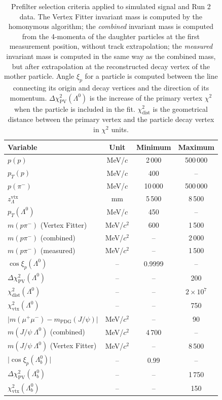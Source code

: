 \begin{table}[t]
	\begin{center}
	\begin{tabular}{|l|c||c|c|}
		\hline
		Variable & Unit & Minimum & Maximum \\
		\hline
		\hline
		$p(p)$ 						& MeV/$c$ 	& 2\,000	& 500\,000 \\
		$p_T(p)$ 					& MeV/$c$ 	& 400		& -- \\
		$p(\pi^-)$ 					& MeV/$c$ 	& 10\,000	& 500\,000 \\
		$z_\Lambda^\text{vtx}$		& mm		& 5\,500	& 8\,500 \\
		$p_T(\Lambda^0)$ 			& MeV/$c$ 	& 450		& -- \\
		$m(p\pi^-)$	(Vertex Fitter)	& MeV/$c^2$	& 600		& 1\,500 \\
		$m(p\pi^-)$	(combined)		& MeV/$c^2$	& --		& 2\,000 \\
		$m(p\pi^-)$	(measured)		& MeV/$c^2$	& --		& 1\,500 \\
		$\cos\xi_p (\Lambda^0)$		& --		& 0.9999	& -- \\
		$\Delta \chi^2_\text{PV} (\Lambda^0)$
									& -- 		& --		& 200 \\
		$\chi^2_\text{dist} (\Lambda^0)$
									& --		& --		& $2\times{10}^{7}$ \\
		$\chi^2_\text{vtx} (\Lambda^0)$
									& --		& --		& 750 \\
		$\lvert m(\mu^+ \mu^-) - m_\text{PDG} (J/\psi) \rvert$
									& MeV/$c^2$ & --		& 90 \\
		$m(J/\psi~\Lambda^0)$ (combined)
									& MeV/$c^2$	& 4\,700		& -- \\
		$m(J/\psi~\Lambda^0)$ (Vertex Fitter)
									& MeV/$c^2$	& --		& 8\,500 \\
		$\lvert \cos\xi_p (\Lambda^0_b) \rvert$
									& --		& 0.99		& -- \\
		$\Delta \chi^2_\text{PV} (\Lambda^0_b)$
									& -- 		& --		& 1\,750 \\
		$\chi^2_\text{vtx} (\Lambda^0_b)$
									& --		& --		& 150 \\
		\hline
	\end{tabular}
	\end{center}
	\caption{Prefilter selection criteria applied to simulated \demonstratorshort signal and Run 2 data. The Vertex Fitter invariant mass is computed by the homonymous algorithm; the \textit{combined} invariant mass is computed from the 4-momenta of the daughter particles at the first measurement position, without track extrapolation; the \textit{measured} invariant mass is computed in the same way as the combined mass, but after extrapolation at the reconstructed decay vertex of the mother particle. Angle $\xi_p$ for a particle is computed between the line connecting its origin and decay vertices and the direction of its momentum. $\Delta \chi^2_\text{PV} (\Lambda^0)$ is the increase of the primary vertex $\chi^2$ when the particle is included in the fit. $\chi^2_\text{dist}$ is the geometrical distance between the primary vertex and the particle decay vertex in $\chi^2$ units.}
	\label{tab:4:prefilters}
\end{table}

